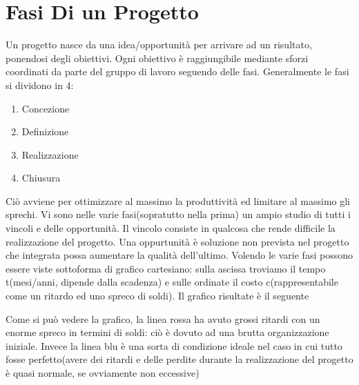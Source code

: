 \documentclass{report}
\begin{document}
\chapter{Fasi Di un Progetto}
Un progetto nasce da una idea/opportunità per arrivare ad un risultato, ponendosi degli obiettivi.
Ogni obiettivo è raggiungibile mediante sforzi coordinati da parte del gruppo di lavoro seguendo delle fasi.
Generalmente le fasi si dividono in 4:

\begin{enumerate}
\item Concezione
\item Definizione
\item Realizzazione
\item Chiusura	
\end{enumerate}

Ciò avviene per ottimizzare al massimo la produttività ed limitare al massimo gli sprechi.
Vi sono nelle varie fasi(sopratutto nella prima) un ampio studio di tutti i vincoli e delle opportunità.
Il vincolo consiste in qualcosa che rende difficile la realizzazione del progetto.
Una oppurtunità è soluzione non prevista nel progetto che integrata possa aumentare la qualità dell'ultimo.
Volendo le varie fasi possono essere viste sottoforma di grafico cartesiano:
sulla ascissa troviamo il tempo t(mesi/anni, dipende dalla scadenza) e sulle ordinate il costo c(rappresentabile come un ritardo ed uno spreco di soldi).
Il grafico risultate è il seguente


Come si può vedere la grafico, la linea rossa ha avuto grossi ritardi con un enorme spreco in termini di soldi: ciò è dovuto ad una brutta organizzazione iniziale.
Invece la linea blu è una sorta di condizione ideale nel caso in cui tutto fosse perfetto(avere dei ritardi e delle perdite durante la realizzazione del progetto è quasi normale, se ovviamente non eccessive)
\end{document}
